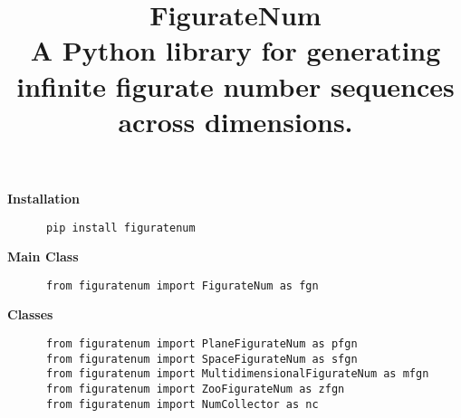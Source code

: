 \documentclass{article}
\title{\huge \textbf{FigurateNum} \\
   \Large  A Python library for generating infinite figurate number sequences across dimensions.}
\author{}
\date{}
\begin{document}
\begin{tcolorbox}[leftrule=1mm, rightrule=1mm, toprule=1mm, bottomrule=1mm ]
  \maketitle
  \vspace{-4.5em}
  \begin{multicols}{2}
    \begin{tcolorbox}[leftrule=2mm, rightrule=0mm, toprule=0mm, bottomrule=0mm,  colframe=SpringGreen4, colback=SpringGreen4!12, height=1.7cm]
      \textbf{\large Installation}
      \begin{lstlisting}
      pip install figuratenum
      \end{lstlisting}
    \end{tcolorbox}
    \begin{tcolorbox}[leftrule=2mm, rightrule=0mm, toprule=0mm, bottomrule=0mm,  colframe=SpringGreen4, colback=SpringGreen4!12, height=1.7cm]
      \textbf{\large Main Class}
      \begin{lstlisting}
      from figuratenum import FigurateNum as fgn
      \end{lstlisting}
    \end{tcolorbox}
    \begin{tcolorbox}[leftrule=2mm, rightrule=0mm, toprule=0mm, bottomrule=0mm,  colframe=SpringGreen4, colback=SpringGreen4!12, height=3.6cm]
      \textbf{\large Classes}
      \begin{lstlisting}
      from figuratenum import PlaneFigurateNum as pfgn
      from figuratenum import SpaceFigurateNum as sfgn
      from figuratenum import MultidimensionalFigurateNum as mfgn
      from figuratenum import ZooFigurateNum as zfgn
      from figuratenum import NumCollector as nc
      \end{lstlisting}
    \end{tcolorbox}
  \end{multicols}
\end{tcolorbox}

\thispagestyle{fancy}
\end{document}
